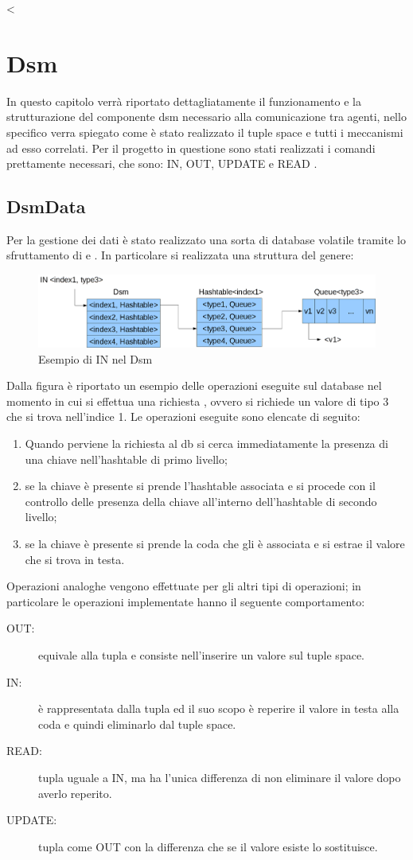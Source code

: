 <\chapter{Dsm}
In questo capitolo verrà riportato dettagliatamente il funzionamento e la strutturazione del componente dsm necessario alla comunicazione tra agenti, nello specifico verra spiegato come è stato realizzato il tuple space e tutti i meccanismi ad esso correlati.
Per il progetto in questione sono stati realizzati i comandi prettamente necessari, che sono: IN, OUT, UPDATE e READ \cite{linda}.
\section{DsmData}
Per la gestione dei dati è stato realizzato una sorta di database volatile tramite lo sfruttamento di  e . In particolare si realizzata una struttura del genere:
\begin{figure}[H]
\begin{center}
\includegraphics[scale=0.3]{etc/dsm.png}
\caption{Esempio di IN nel Dsm}
\label{dsm1}
\end{center}
\end{figure}
Dalla figura è riportato un esempio delle operazioni eseguite sul database nel momento in cui si effettua una richiesta , ovvero si richiede un valore di tipo 3 che si trova nell'indice 1. Le operazioni eseguite sono elencate di seguito:
\begin{enumerate}
	\item Quando perviene la richiesta al db si cerca immediatamente la presenza di una chiave  nell'hashtable di primo livello;
	\item se la chiave è presente si prende l'hashtable associata e si procede con il controllo delle presenza della chiave  all'interno dell'hashtable di secondo livello;
	\item se la chiave è presente si prende la coda che gli è associata e si estrae il valore che si trova in testa.
\end{enumerate}
Operazioni analoghe vengono effettuate per gli altri tipi di operazioni; in particolare le operazioni implementate hanno il seguente comportamento:
\begin{description}
	\item[OUT:] equivale alla tupla  e consiste nell'inserire un valore sul tuple space.
	\item[IN:] è rappresentata dalla tupla  ed il suo scopo è reperire il valore in testa alla coda e quindi eliminarlo dal tuple space.
	\item[READ:] tupla uguale a IN, ma ha l'unica differenza di non eliminare il valore dopo averlo reperito.
	\item[UPDATE:] tupla come OUT con la differenza che se il valore esiste lo sostituisce.
\end{description}
